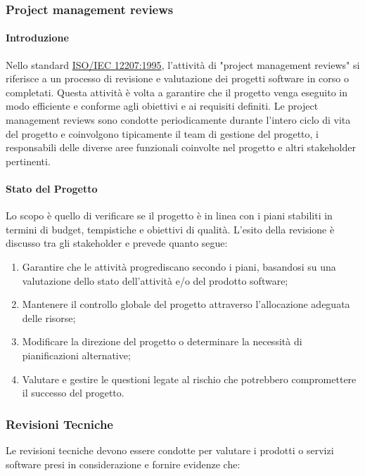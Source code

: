 \subsubsection{Project management reviews}

\paragraph{Introduzione}
Nello standard \href{https://www.math.unipd.it/~tullio/IS-1/2009/Approfondimenti/ISO_12207-1995.pdf}{ISO/IEC 12207:1995}, l'attività di "project management reviews" si riferisce a un processo di revisione e valutazione dei progetti software in corso o completati. Questa attività è volta a garantire che il progetto venga eseguito in modo efficiente e conforme agli obiettivi e ai requisiti definiti.
Le project management reviews sono condotte periodicamente durante l'intero ciclo di vita del progetto e coinvolgono tipicamente il team di gestione del progetto, i responsabili delle diverse aree funzionali coinvolte nel progetto e altri stakeholder pertinenti.

\paragraph{Stato del Progetto}
Lo scopo è quello di verificare se il progetto è in linea con i piani stabiliti in termini di budget, tempistiche e obiettivi di qualità.
L'esito della revisione è discusso tra gli stakeholder e prevede quanto segue:
\begin{enumerate}
    \item Garantire che le attività progrediscano secondo i piani, basandosi su una valutazione dello stato dell'attività e/o del prodotto software;
    \item Mantenere il controllo globale del progetto attraverso l'allocazione adeguata delle risorse;
    \item Modificare la direzione del progetto o determinare la necessità di pianificazioni alternative;
    \item Valutare e gestire le questioni legate al rischio che potrebbero compromettere il successo del progetto.
\end{enumerate}

\subsubsection{Revisioni Tecniche}
Le revisioni tecniche devono essere condotte per valutare i prodotti o servizi software presi in considerazione e fornire evidenze che:

